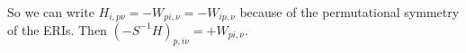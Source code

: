 \begin{align}
\end{align}
So we can write ${H_{i,p \nu} = -W_{pi,\nu}=-W_{ip,\nu}}$ because of the permutational symmetry of the ERIs. Then $\boxed{(-{S^{-1}H})_{p,i \nu} =+ W_{pi,\nu}}$.

